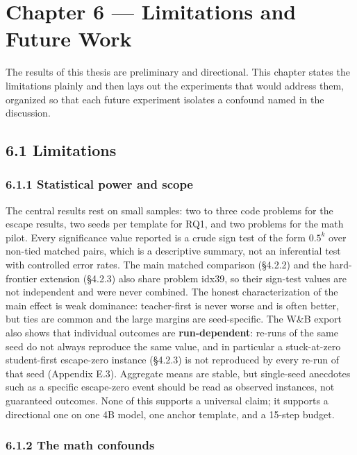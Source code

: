 \chapter{Chapter 6 --- Limitations and Future Work}\label{chapter-6-limitations-and-future-work}

The results of this thesis are preliminary and directional. This chapter states the limitations plainly and then lays out the experiments that would address them, organized so that each future experiment isolates a confound named in the discussion.

\section{6.1 Limitations}\label{limitations}

\subsection{6.1.1 Statistical power and scope}\label{statistical-power-and-scope}

The central results rest on small samples: two to three code problems for the escape results, two seeds per template for RQ1, and two problems for the math pilot. Every significance value reported is a crude sign test of the form \(0.5^k\) over non-tied matched pairs, which is a descriptive summary, not an inferential test with controlled error rates. The main matched comparison (§4.2.2) and the hard-frontier extension (§4.2.3) also share problem idx39, so their sign-test values are not independent and were never combined. The honest characterization of the main effect is weak dominance: teacher-first is never worse and is often better, but ties are common and the large margins are seed-specific. The W\&B export also shows that individual outcomes are \textbf{run-dependent}: re-runs of the same seed do not always reproduce the same value, and in particular a stuck-at-zero student-first escape-zero instance (§4.2.3) is not reproduced by every re-run of that seed (Appendix E.3). Aggregate means are stable, but single-seed anecdotes such as a specific escape-zero event should be read as observed instances, not guaranteed outcomes. None of this supports a universal claim; it supports a directional one on one 4B model, one anchor template, and a 15-step budget.

\subsection{6.1.2 The math confounds}\label{the-math-confounds}

